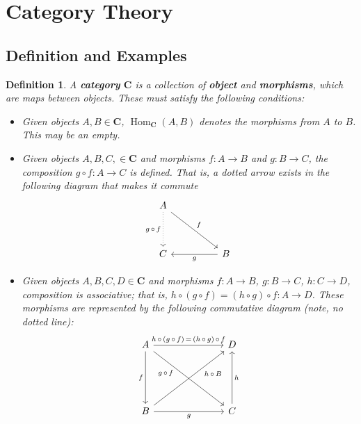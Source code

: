 \documentclass[12pt,reqno]{amsart}
\theoremstyle{plain}
\newtheorem{defi}{Definition}
\newcommand{\cat}{\mathbf{C}}
\DeclareMathOperator{\Hom}{Hom}
\begin{document}
\section{Category Theory}
\subsection{Definition and Examples}
\begin{defi} A \textbf{category} $\mathbf{C}$ is a collection of \textbf{object} and \textbf{morphisms}, which are maps between objects. These must satisfy the following conditions: 
\begin{itemize}
\item[\textup{(i)}] Given objects $A, B \in \cat$, $\Hom_{\cat} (A, B)$ denotes the morphisms from $A$ to $B$. This may be an empty. 
\item[\textup{(ii)}] Given objects $A, B, C,  \in \cat$ and morphisms $f \colon A \to B$ and $g \colon B \to C$, the composition $g \circ f \colon A \to C$ is defined. That is, a dotted arrow exists in the following diagram that makes it commute 
\[ 
\begin{tikzcd}
A \arrow[rrdd, "f"] \arrow[dd, "g \, \circ \, f"', dotted] &  &                   \\
                                             &  &                   \\
C                                            &  & B \arrow[ll, "g"]
\end{tikzcd}
\] 
\item[\textup{(iii)}] Given objects $A, B, C, D \in \cat$ and morphisms $f \colon A \to B$, $g \colon B \to C$, $h \colon C \to D$, composition is associative; that is, $h \circ ( g \circ f) = (h \circ g) \circ f \colon A \to D$. These morphisms are represented by the following commutative diagram (note, no dotted line): 
\[
\begin{tikzcd}
A \arrow[ddd, "f"'] \arrow[rrr, "h \, \circ \, ( g \, \circ \, f) \, = \, (h \, \circ \, g) \, \circ \, f"] \arrow[rrrddd, "\; \; \; \; \; \; h \, \circ \, B"] &  &  & D                   \\
                                                         &  &  &                     \\
                                                         &  &  &                     \\
B \arrow[rrr, "g"'] \arrow[rrruuu, "g \, \circ \, f \; \; \; \; \; \; "]                  &  &  & C \arrow[uuu, "h"']
\end{tikzcd}
\]
\end{itemize}
\end{defi}
\end{document}
